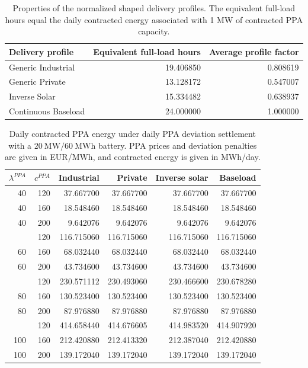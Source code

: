 \begin{table}[p]
\centering
\small
\caption{Properties of the normalized shaped delivery profiles. The equivalent full-load hours equal the daily contracted energy associated with 1 MW of contracted PPA capacity.}
\label{tab:ppa_delivery_profile_metrics}
\begin{tabular*}{\textwidth}{@{\extracolsep{\fill}}lrr@{}}
\toprule
Delivery profile & Equivalent full-load hours & Average profile factor \\
\midrule
Generic Industrial & 19.406850 & 0.808619 \\
Generic Private & 13.128172 & 0.547007 \\
Inverse Solar & 15.334482 & 0.638937 \\
Continuous Baseload & 24.000000 & 1.000000 \\
\bottomrule
\end{tabular*}
\end{table}


\begin{table}[p]
\centering
\small
\caption{Daily contracted PPA energy under daily PPA deviation settlement with a $20~\mathrm{MW}/60~\mathrm{MWh}$ battery. PPA prices and deviation penalties are given in EUR/MWh, and contracted energy is given in MWh/day.}
\label{tab:contracted-energy-daily-p-20-e-60}
\begin{tabular*}{\textwidth}{@{\extracolsep{\fill}}rrrrrr@{}}
\toprule
$\lambda^{PPA}$ & $c^{PPA}$ & Industrial & Private & Inverse solar & Baseload \\
\midrule
40 & 120 & 37.667700 & 37.667700 & 37.667700 & 37.667700 \\
40 & 160 & 18.548460 & 18.548460 & 18.548460 & 18.548460 \\
40 & 200 & 9.642076 & 9.642076 & 9.642076 & 9.642076 \\
\addlinespace
60 & 120 & 116.715060 & 116.715060 & 116.715060 & 116.715060 \\
60 & 160 & 68.032440 & 68.032440 & 68.032440 & 68.032440 \\
60 & 200 & 43.734600 & 43.734600 & 43.734600 & 43.734600 \\
\addlinespace
80 & 120 & 230.571112 & 230.493060 & 230.466600 & 230.678280 \\
80 & 160 & 130.523400 & 130.523400 & 130.523400 & 130.523400 \\
80 & 200 & 87.976880 & 87.976880 & 87.976880 & 87.976880 \\
\addlinespace
100 & 120 & 414.658440 & 414.676605 & 414.983520 & 414.907920 \\
100 & 160 & 212.420880 & 212.413320 & 212.387040 & 212.420880 \\
100 & 200 & 139.172040 & 139.172040 & 139.172040 & 139.172040 \\
\bottomrule
\end{tabular*}
\end{table}


